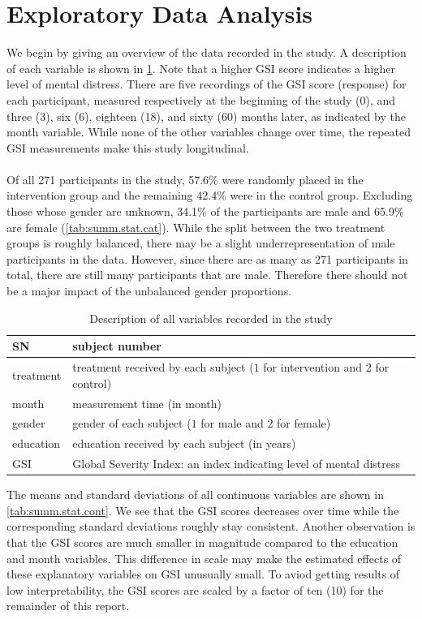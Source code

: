 \section{Exploratory Data Analysis}
We begin by giving an overview of the data recorded in the study. A description of each variable is shown in \cref{tab:var.decription}. Note that a higher GSI score indicates a higher level of mental distress. There are five recordings of the GSI score (response) for each participant, measured respectively at the beginning of the study (0), and three (3), six (6), eighteen (18), and sixty (60) months later, as indicated by the month variable. While none of the other variables change over time, the repeated GSI measurements make this study longitudinal.\\\\
Of all 271 participants in the study, 57.6\% were randomly placed in the intervention group and the remaining 42.4\% were in the control group. Excluding those whose gender are unknown, 34.1\% of the participants are male and 65.9\% are female (\cref{tab:summ.stat.cat}). While the split between the two treatment groups is roughly balanced, there may be a slight underrepresentation of male participants in the data. However, since there are as many as 271 participants in total, there are still many participants that are male. Therefore there should not be a major impact of the unbalanced gender proportions.
\begin{table}[H]
\centering
\begin{tabular}{|l|l|}
\hline
SN & subject number \\
\hline
treatment & treatment received by each subject ($1$ for intervention and $2$ for control)\\
\hline
month & measurement time (in month)\\
\hline
gender & gender of each subject ($1$ for male and $2$ for female)\\
\hline
education & education received by each subject (in years)\\
\hline
GSI & Global Severity Index: an index indicating level of mental distress\\
\hline
\end{tabular}
\caption{Description of all variables recorded in the study}
\label{tab:var.decription}
\end{table}
\noindent The means and standard deviations of all continuous variables are shown in \cref{tab:summ.stat.cont}. We see that the GSI scores decreases over time while the corresponding standard deviations roughly stay consistent. Another observation is that the GSI scores are much smaller in magnitude compared to the education and month variables. This difference in scale may make the estimated effects of these explanatory variables on GSI unusually small. To aviod getting results of low interpretability, the GSI scores are scaled by a factor of ten (10) for the remainder of this report.\\\\
